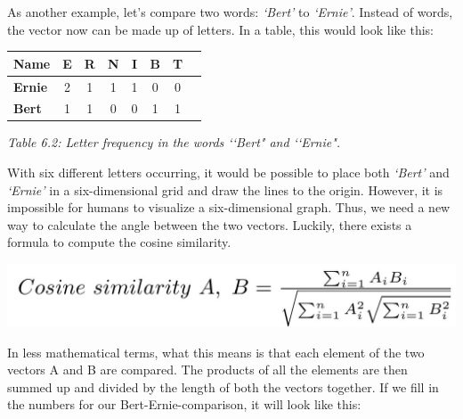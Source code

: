 As another example, let’s compare two words: \textit{‘Bert’} to \textit{‘Ernie’}. Instead of words, the vector now can be made up of letters. In a table, this would look like this:

\begin{center}
\begin{tabular}{|l|c|c|c|c|c|c|c|}
\hline
{\bf Name} & {\bf E} & {\bf R} & {\bf N} & {\bf I} & {\bf B} & {\bf T} \\
\hline
{\bf Ernie} & 2 & 1 & 1 & 1 & 0 & 0\\
{\bf Bert} & 1 & 1 & 0 & 0  & 1 & 1 \\
\hline
\end{tabular}

{\it \footnotesize Table 6.2: Letter frequency in the words \lq\lq Bert" and \lq\lq Ernie".}
\end{center}

\noindent With six different letters occurring, it would be possible to place both \textit{‘Bert’} and \textit{‘Ernie’} in a six-dimensional grid and draw the lines to the origin. However, it is impossible for humans to visualize a six-dimensional graph. Thus, we need a new way to calculate the angle between the two vectors. Luckily, there exists a formula to compute the cosine similarity. 

\begin{center}
\includegraphics[scale=0.2]{./Images/cosine.jpeg}
\end{center}

%


In less mathematical terms, what this means is that each element of the two vectors A and B are compared. The products of all the elements are then summed up and divided by the length of both the vectors together. If we fill in the numbers for our Bert-Ernie-comparison, it will look like this: 

